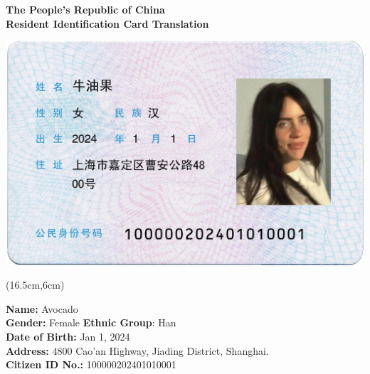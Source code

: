 \documentclass[a4paper,12pt]{article}
\begin{document}
	
	\begin{center}
		\Large \textbf{The People's Republic of China \\ Resident Identification Card Translation}
	\end{center}
	
	\vspace{1cm}
	
	\noindent
	\begin{minipage}[t]{0.47\textwidth}
		\includegraphics[width=\textwidth]{image/front.jpg} 
	\end{minipage}%
	\hfill
	\begin{minipage}[t]{0.51\textwidth}
		\begin{textblock*}{2cm}(16.5cm,6cm) %
		\end{textblock*}
		\begin{tcolorbox}[colframe=black, colback=white]
			\begin{spacing}{1.6}
				\scriptsize
				
				\vskip 0.35cm
				
				\textbf{Name:} Avocado \\
				\textbf{Gender:} Female \quad \textbf{Ethnic Group}: Han \\
				\textbf{Date of Birth:} Jan 1, 2024\\
				\textbf{Address:} 4800 Cao'an Highway, Jiading District, Shanghai.\\

				\textbf{Citizen ID No.:} 100000202401010001
			\end{spacing}
		\end{tcolorbox}
	\end{minipage}
\end{document}
